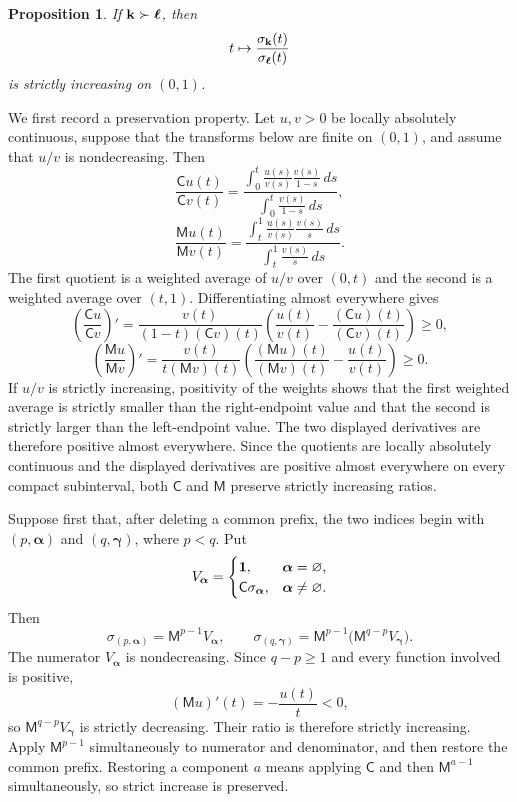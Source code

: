 \documentclass[12pt,a4paper]{amsart}
\makeatletter
\numberwithin{equation}{section}
\renewenvironment{proof}[1][Proof]{%
  \par\pushQED{\qed}%
  \normalfont\topsep6\p@\@plus6\p@\relax
  \trivlist
  \item[\hskip\labelsep\bfseries #1:]\ignorespaces
}{%
  \popQED\endtrivlist\@endpefalse
}
\theoremstyle{plain}
\newtheorem{prop}[Thm]{Proposition}
\theoremstyle{definition}
\makeatother
\begin{document}
\begin{prop}\label{strictMLR}
If ${\bf k}\succ{\boldsymbol\ell}$, then
\begin{equation}\label{MLRratio}
t\mapsto\frac{\sigma_{\bf k}(t)}{\sigma_{\boldsymbol\ell}(t)}
\end{equation}
is strictly increasing on $(0,1)$.
\end{prop}

\begin{proof}
We first record a preservation property.  Let $u,v>0$ be locally absolutely continuous, suppose that the transforms below are finite on $(0,1)$, and assume that $u/v$ is nondecreasing.  Then
\[
\frac{\mathsf{C}u(t)}{\mathsf{C}v(t)}
=
\frac{\displaystyle\int_0^t\frac{u(s)}{v(s)}\frac{v(s)}{1-s}\,ds}
{\displaystyle\int_0^t\frac{v(s)}{1-s}\,ds},
\]
\[
\frac{\mathsf{M}u(t)}{\mathsf{M}v(t)}
=
\frac{\displaystyle\int_t^1\frac{u(s)}{v(s)}\frac{v(s)}s\,ds}
{\displaystyle\int_t^1\frac{v(s)}s\,ds}.
\]
The first quotient is a weighted average of $u/v$ over $(0,t)$ and the second is a weighted average over $(t,1)$.  Differentiating almost everywhere gives
\[
\left(\frac{\mathsf{C}u}{\mathsf{C}v}\right)'
=
\frac{v(t)}{(1-t)(\mathsf{C}v)(t)}
\left(\frac{u(t)}{v(t)}-\frac{(\mathsf{C}u)(t)}{(\mathsf{C}v)(t)}\right)\geq 0,
\]
\[
\left(\frac{\mathsf{M}u}{\mathsf{M}v}\right)'
=
\frac{v(t)}{t(\mathsf{M}v)(t)}
\left(\frac{(\mathsf{M}u)(t)}{(\mathsf{M}v)(t)}-\frac{u(t)}{v(t)}\right)\geq 0.
\]
If $u/v$ is strictly increasing, positivity of the weights shows that the first weighted average is strictly smaller than the right-endpoint value and that the second is strictly larger than the left-endpoint value.  The two displayed derivatives are therefore positive almost everywhere.  Since the quotients are locally absolutely continuous and the displayed derivatives are positive almost everywhere on every compact subinterval, both $\mathsf{C}$ and $\mathsf{M}$ preserve strictly increasing ratios.

Suppose first that, after deleting a common prefix, the two indices begin with $(p,{\boldsymbol\alpha})$ and $(q,{\boldsymbol\gamma})$, where $p<q$.  Put
\[
V_{\boldsymbol\alpha}=
\begin{cases}
{\bf 1},&{\boldsymbol\alpha}=\varnothing,\\
\mathsf{C}\sigma_{\boldsymbol\alpha},&{\boldsymbol\alpha}\neq\varnothing.
\end{cases}
\]
Then
\[
\sigma_{(p,{\boldsymbol\alpha})}=\mathsf{M}^{p-1}V_{\boldsymbol\alpha},
\qquad
\sigma_{(q,{\boldsymbol\gamma})}
=\mathsf{M}^{p-1}\big(\mathsf{M}^{q-p}V_{\boldsymbol\gamma}\big).
\]
The numerator $V_{\boldsymbol\alpha}$ is nondecreasing.  Since $q-p\geq1$ and every function involved is positive,
\[
(\mathsf{M}u)'(t)=-\frac{u(t)}t<0,
\]
so $\mathsf{M}^{q-p}V_{\boldsymbol\gamma}$ is strictly decreasing.  Their ratio is therefore strictly increasing.  Apply $\mathsf{M}^{p-1}$ simultaneously to numerator and denominator, and then restore the common prefix.  Restoring a component $a$ means applying $\mathsf{C}$ and then $\mathsf{M}^{a-1}$ simultaneously, so strict increase is preserved.


\end{proof}
\end{document}
